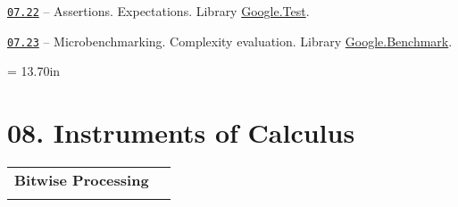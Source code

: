 \documentclass[a4paper,12pt]{article}
\renewenvironment{itemize}
{
    \begin{list}{\labelitemi}
    {
      \setlength{\topsep}{0pt}
      \setlength{\partopsep}{0pt}
      \setlength{\parskip}{0pt}
      \setlength{\itemsep}{0pt}
      \setlength{\parsep}{0pt}
      \setlength{\leftmargin}{14.5pt}
    }
}{\end{list}}
\begin{document}
\begin{itemize}
    \smallskip

    \item \href{https://github.com/i-s-m-mipt/Education/blob/master/projects/examples/source/07.22.cpp}{\texttt{07.22}} --  Assertions. Expectations. Library \href{https://github.com/google/googletest}{Google.Test}.

    \smallskip

    \item \href{https://github.com/i-s-m-mipt/Education/blob/master/projects/examples/source/07.23.cpp}{\texttt{07.23}} --  Microbenchmarking. Complexity evaluation. Library \href{https://github.com/google/benchmark}{Google.Benchmark}.

\end{itemize}



\newpage\thispagestyle{empty}\pdfpageheight = 13.70in\enlargethispage{100in}

\section{08. Instruments of Calculus}

\begin{tabular}{!{\vrule width 1pt}L{3.7cm}!{\vrule width 1pt}L{15.3cm}!{\vrule width 0pt}} 


\textbf{Bitwise Processing} & \\


\end{tabular}

\medskip\smallskip
\end{document}
